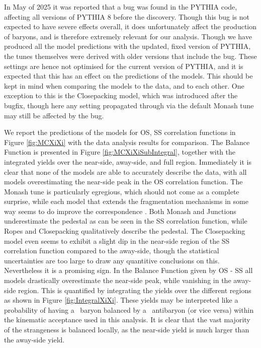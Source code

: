   In May of 2025 it was reported that a bug was found in the PYTHIA code, affecting all versions of PYTHIA 8 before the discovery. \cite{PYTHIABugFix}  Though this bug is not expected to have severe effects overall, it does unfortunately affect the production of baryons, and is therefore extremely relevant for our analysis. Though we have produced all the model predictions with the updated, fixed version of PYTHIA, the tunes themselves were derived with older versions that include the bug. These settings are hence not optimised for the current version of PYTHIA, and it is expected that this has an effect on the predictions of the models. This should be kept in mind when comparing the models to the data, and to each other. One exception to this is the Closepacking model, which was introduced after the bugfix, though  here any setting propagated through via the default Monash tune may still be affected by the bug. 

  We report the predictions of the models for OS, SS correlation functions in Figure \ref{fig:MCXiXi} with the data analysis results for comparison. The Balance Function is presented in Figure \ref{fig:MCXiXiSubIntegral}, together with the integrated yields over the near-side, away-side, and full region. Immediately it is clear that none of the models are able to accurately describe the data, with all models overestimating the near-side peak in the OS correlation function. The Monash tune is particularly egregious, which should not come as a complete surprise, while each model that extends the fragmentation mechanisms in some way seems to do improve the correspondence . Both Monash and Junctions underestimate the pedestal as can be seen in the SS correlation function, while Ropes and Closepacking qualitatively describe the pedestal. The Closepacking model even seems to exhibit a slight dip in the near-side region of the SS correlation function compared to the away-side, though the statistical uncertainties are too large to draw any quantitive conclusions on this. Nevertheless it is a promising sign. In the Balance Function given by OS - SS all models drastically overestimate the near-side peak, while vanishing in the away-side region. This is quantified by integrating the yields over the different regions as shown in Figure \ref{fig:IntegralXiXi}. These yields may be interpreted like a probability of having a \Xi\ baryon balanced by a \Xi\ antibaryon (or vice versa) within the kinematic acceptance used in this analysis. It is clear that the vast majority of the strangeness is balanced locally, as the near-side yield is much larger than the away-side yield. 

